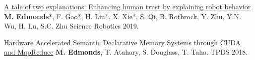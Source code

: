 


\begin{cvpublications}

\item \cvpublication
{\href{https://robotics.sciencemag.org/content/4/37/eaay4663}{A tale of two explanations: Enhancing human trust by explaining robot behavior}} %
{\textbf{M. Edmonds}*, F. Gao*, H. Liu*, X. Xie*, S. Qi, B. Rothrock, Y. Zhu, Y.N. Wu, H. Lu, S.C. Zhu} %
{Science Robotics 2019.} %
{} %

\item \cvpublication
{\href{http://www.mjedmonds.com/projects/DM/TPDS18_HADM_final.pdf}{Hardware Accelerated Semantic Declarative Memory Systems through CUDA and MapReduce}} %
{\textbf{M. Edmonds}, T. Atahary, S. Douglass, T. Taha.} %
{TPDS 2018.} %
{} %

\cvequalcontribution

\end{cvpublications}